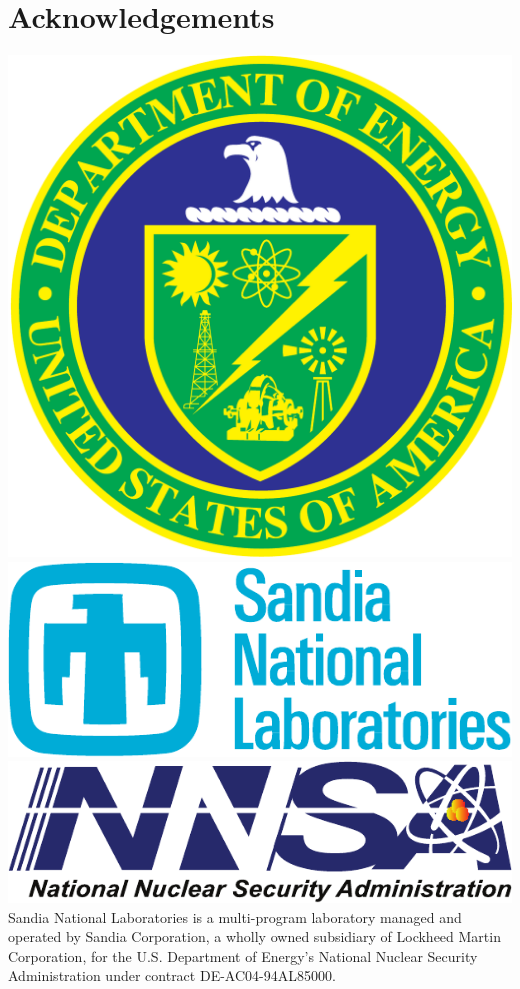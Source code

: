 \documentclass[conference]{sig-alt-gov2}
\begin{document}
\section{Acknowledgements}
\includegraphics[scale=0.07]{logos/doe_logo}
\includegraphics[scale=0.30]{logos/snl_logo}
\includegraphics[scale=0.35]{logos/nnsa_logo}
Sandia National Laboratories is a multi-program laboratory managed and operated
by Sandia Corporation, a wholly owned subsidiary of Lockheed Martin
Corporation, for the U.S. Department of Energy's National Nuclear Security
Administration under contract DE-AC04-94AL85000.




\vfill\eject
\end{document}
